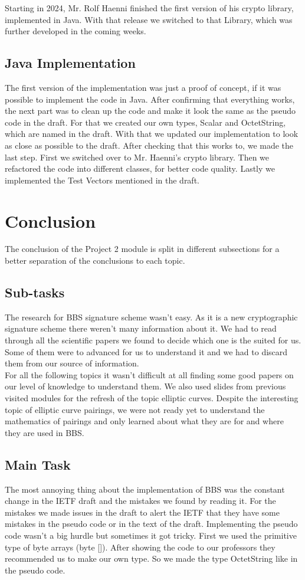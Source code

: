 \documentclass{article}
\begin{document}
Starting in 2024, Mr. Rolf Haenni finished the first version of his crypto library, implemented in Java.
With that release we switched to that Library, which was further developed in the coming weeks.
 
\subsection{Java Implementation}
The first version of the implementation was just a proof of concept, if it was possible to implement the code in Java.
After confirming that everything works, the next part was to clean up the code and make it look the same as the pseudo code in the draft.
For that we created our own types, Scalar and OctetString, which are named in the draft.
With that we updated our implementation to look as close as possible to the draft.
After checking that this works to, we made the last step.
First we switched over to Mr. Haenni's crypto library.
Then we refactored the code into different classes, for better code quality.
Lastly we implemented the Test Vectors mentioned in the draft.

\section{Conclusion}
The conclusion of the Project 2 module is split in different subsections for a better separation of the conclusions to each topic. 

\subsection{Sub-tasks}
The research for BBS signature scheme wasn't easy. As it is a new cryptographic signature scheme there weren't many information about it. 
We had to read through all the scientific papers we found to decide which one is the suited for us. Some of them were to advanced for us to understand it and we had to discard them from our source of information. \\
For all the following topics it wasn't difficult at all finding some good papers on our level of knowledge to understand them. We also used slides from previous visited modules for the refresh of the topic elliptic curves.
Despite the interesting topic of elliptic curve pairings, we were not ready yet to understand the mathematics of pairings and only learned about what they are for and where they are used in \gls{BBS}. \\

\subsection{Main Task}
The most annoying thing about the implementation of \gls{BBS} was the constant change in the IETF draft and the mistakes we found by reading it. For the mistakes we made issues in the draft to alert the IETF that they have some mistakes in the pseudo code or in the text of the draft. Implementing the pseudo code wasn't a big hurdle but sometimes it got tricky. First we used the primitive type of byte arrays (byte []). After showing the code to our professors they recommended us to make our own type. So we made the type OctetString like in the pseudo code. 
\end{document}
